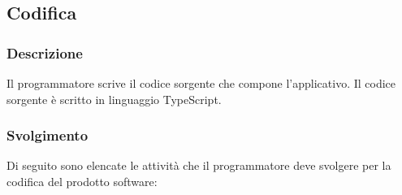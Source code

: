 \subsection{Codifica}
\label{codifica}

\subsubsection{Descrizione}

Il programmatore scrive il codice sorgente che compone l'applicativo. Il codice
sorgente è scritto in linguaggio TypeScript.

\subsubsection{Svolgimento}
Di seguito sono elencate le attività che il programmatore deve svolgere per la
codifica del prodotto software:

